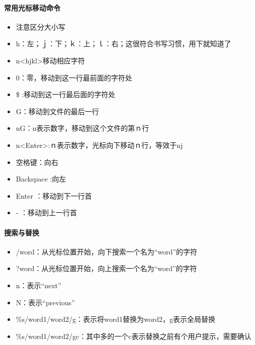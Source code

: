 {\paragraph{常用光标移动命令}
\begin{itemize}
\item {\color{red}注意区分大小写}
\item h：左；ｊ：下；ｋ：上；ｌ：右；这很符合书写习惯，用下就知道了
\item n<hjkl>移动相应字符
\item 0：零，移动到这一行最前面的字符处
\item \$ :移动到这一行最后面的字符处
\item G：移动到文件的最后一行
\item nG：n表示数字，移动到这个文件的第ｎ行
\item n<Enter>:ｎ表示数字，光标向下移动ｎ行，等效于nj
\item 空格键：向右
\item Backspace :向左
\item Enter ：移动到下一行首
\item - ：移动到上一行首
\end{itemize}


\paragraph{搜索与替换}
\begin{itemize}
\item /word：从光标位置开始，向下搜索一个名为“word”的字符
\item ?word：从光标位置开始，向上搜索一个名为“word”的字符
\item n：表示“next”
\item N：表示“previous”
\item \%s/word1/word2/g：表示将word1替换为word2，g表示全局替换
\item \%s/word1/word2/gc：其中多的一个c表示替换之前有个用户提示，需要确认
\end{itemize}


}
